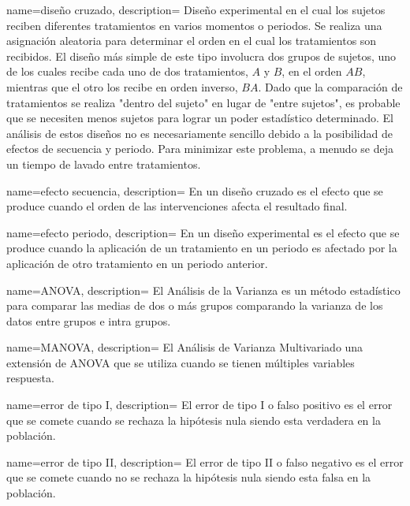 {
    name=diseño cruzado,
    description={
        Diseño experimental en el cual los sujetos reciben diferentes tratamientos en varios momentos o periodos.
        Se realiza una asignación aleatoria para determinar el orden en el cual los tratamientos son recibidos.
        El diseño más simple de este tipo involucra dos grupos de sujetos,
        uno de los cuales recibe cada uno de dos tratamientos, $A$ y $B$, en el orden $AB$,
        mientras que el otro los recibe en orden inverso, $BA$.
        Dado que la comparación de tratamientos se realiza "dentro del sujeto" en lugar de "entre sujetos", es probable
        que se necesiten menos sujetos para lograr un poder estadístico determinado.
        El análisis de estos diseños no es necesariamente sencillo debido a la posibilidad de efectos de secuencia y periodo.
        Para minimizar este problema, a menudo se deja un tiempo de lavado entre tratamientos.
    }
}


{
    name=efecto secuencia,
    description={
        En un \gls{diseño cruzado} es el efecto que se produce cuando el orden de las intervenciones afecta el resultado final.
    }
}


{
    name=efecto periodo,
    description={
        En un diseño experimental es el efecto que se produce cuando la aplicación de un tratamiento en un periodo
        es afectado por la aplicación de otro tratamiento en un periodo anterior.
    }
}

{
    name=ANOVA,
    description={
        El Análisis de la Varianza es un método estadístico para comparar las medias de dos o más grupos
        comparando la varianza de los datos entre grupos e intra grupos.
    }
}


{
    name=MANOVA,
    description={
        El Análisis de Varianza Multivariado una extensión de \gls{ANOVA}
        que se utiliza cuando se tienen múltiples variables respuesta.
    }
}



{
    name=error de tipo I,
    description={
        El error de tipo I o falso positivo es el error que se comete cuando se rechaza la hipótesis nula
        siendo esta verdadera en la población.
    }
}


{
    name=error de tipo II,
    description={
        El error de tipo II o falso negativo es el error que se comete cuando no se rechaza la hipótesis nula
        siendo esta falsa en la población.
    }
}



